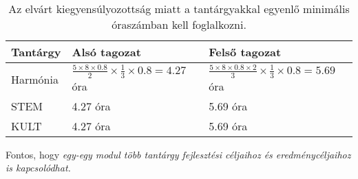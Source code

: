 \begin{table}

  \begin{tabular}{ l|l|l }

    \textbf{Tantárgy} & \textbf{Alsó
    tagozat}          & \textbf{Felső tagozat}                                                      \\ \hline
    Harmónia          & $\frac{5 \times 8 \times 0.8}{2} \times \frac{1}{3} \times 0.8 =
    4.27$ óra         &
    $\frac{5 \times 8 \times 0.8 \times 2}{3} \times \frac{1}{3} \times 0.8 = 5.69$
    óra                                                                                             \\ \hline
    STEM              & 4.27 óra                                                         & 5.69 óra \\ \hline
    KULT              & 4.27 óra                                                         & 5.69 óra \\ \hline

  \end{tabular}
  \caption{Az elvárt kiegyensúlyozottság miatt a tantárgyakkal egyenlő
    minimális óraszámban kell foglalkozni.}
  \label{tbl:oraszamok}
\end{table}

Fontos, hogy \emph{egy-egy modul több tantárgy fejlesztési céljaihoz és
  eredménycéljaihoz is kapcsolódhat.}